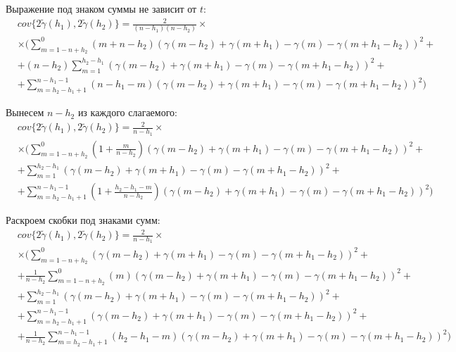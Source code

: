 Выражение под знаком суммы не зависит от $t$:
\begin{eqnarray*}
\nonumber
	& cov\{ 2 \tilde{\gamma}(h_1), 2 \tilde{\gamma}(h_2) \} = \frac{2}{(n - h_1) (n - h_2)} \times \\
	& \times (\sum_{m = 1 - n + h_2}^{0}(m + n - h_2)(\gamma(m - h_2) + \gamma(m + h_1) - \gamma(m) - \gamma(m + h_1 - h_2))^2 + \\
	& + (n - h_2)\sum_{m = 1}^{h_2 - h_1}(\gamma(m - h_2) + \gamma(m + h_1) - \gamma(m) - \gamma(m + h_1 - h_2))^2 + \\
	& + \sum_{m = h_2 - h_1 + 1}^{n - h_1 - 1}(n - h_1 - m)(\gamma(m - h_2) + \gamma(m + h_1) - \gamma(m) - \gamma(m + h_1 - h_2))^2)
\end{eqnarray*}

Вынесем $ n - h_2 $ из каждого слагаемого:
\begin{eqnarray*}
\nonumber
	& cov\{ 2 \tilde{\gamma}(h_1), 2 \tilde{\gamma}(h_2) \} = \frac{2}{n - h_1} \times \\
	& \times (\sum_{m = 1 - n + h_2}^{0} (1 + \frac{m}{n - h_2})(\gamma(m - h_2) + \gamma(m + h_1) - \gamma(m) - \gamma(m + h_1 - h_2))^2 + \\
	& + \sum_{m = 1}^{h_2 - h_1}(\gamma(m - h_2) + \gamma(m + h_1) - \gamma(m) - \gamma(m + h_1 - h_2))^2 + \\
	& + \sum_{m = h_2 - h_1 + 1}^{n - h_1 - 1}(1 + \frac{h_2 - h_1 - m}{n - h_2})(\gamma(m - h_2) + \gamma(m + h_1) - \gamma(m) - \gamma(m + h_1 - h_2))^2)
\end{eqnarray*}

Раскроем скобки под знаками сумм:
\begin{eqnarray*}
\nonumber
	& cov\{ 2 \tilde{\gamma}(h_1), 2 \tilde{\gamma}(h_2) \} = \frac{2}{n - h_1} \times \\
	& \times (\sum_{m = 1 - n + h_2}^{0} (\gamma(m - h_2) + \gamma(m + h_1) - \gamma(m) - \gamma(m + h_1 - h_2))^2 + \\
	& + \frac{1}{n - h_2} \sum_{m = 1 - n + h_2}^{0} (m)(\gamma(m - h_2) + \gamma(m + h_1) - \gamma(m) - \gamma(m + h_1 - h_2))^2 + \\
	& + \sum_{m = 1}^{h_2 - h_1}(\gamma(m - h_2) + \gamma(m + h_1) - \gamma(m) - \gamma(m + h_1 - h_2))^2 + \\
	& + \sum_{m = h_2 - h_1 + 1}^{n - h_1 - 1}(\gamma(m - h_2) + \gamma(m + h_1) - \gamma(m) - \gamma(m + h_1 - h_2))^2 + \\
	& + \frac{1}{n - h_2} \sum_{m = h_2 - h_1 + 1}^{n - h_1 - 1} (h_2 - h_1 -m) (\gamma(m - h_2) + \gamma(m + h_1) - \gamma(m) - \gamma(m + h_1 - h_2))^2)
\end{eqnarray*}

